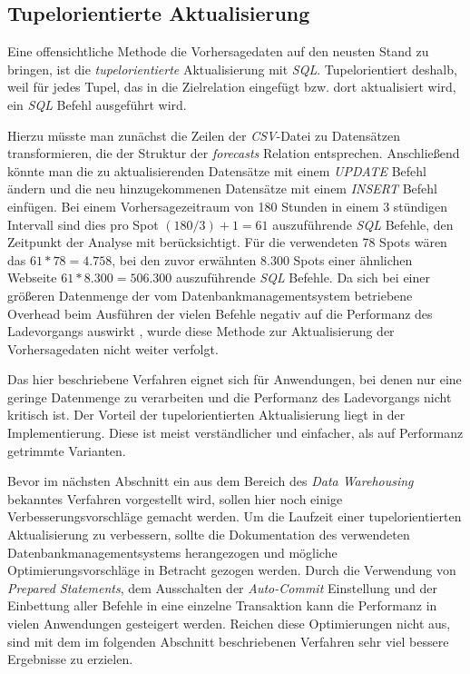 \subsection{Tupelorientierte Aktualisierung}
Eine offensichtliche Methode die Vorhersagedaten auf den neusten Stand
zu bringen, ist die \textit{tupelorientierte} Aktualisierung mit
\textit{SQL}. Tupelorientiert deshalb, weil für jedes Tupel, das in
die Zielrelation eingefügt bzw. dort aktualisiert wird, ein
\textit{SQL} Befehl ausgeführt wird.

Hierzu müsste man zunächst die Zeilen der \textit{CSV}-Datei zu
Datensätzen transformieren, die der Struktur der \textit{forecasts}
Relation entsprechen. Anschließend könnte man die zu aktualisierenden
Datensätze mit einem \textit{UPDATE} Befehl ändern und die neu
hinzugekommenen Datensätze mit einem \textit{INSERT} Befehl
einfügen. Bei einem Vorhersagezeitraum von 180 Stunden in einem 3
stündigen Intervall sind dies pro Spot $(180 / 3) + 1 = 61$
auszuführende \textit{SQL} Befehle, den Zeitpunkt der Analyse mit
berücksichtigt. Für die verwendeten 78 Spots wären das $61 * 78 =
4.758$, bei den zuvor erwähnten 8.300 Spots einer ähnlichen Webseite
$61 * 8.300 = 506.300$ auszuführende \textit{SQL} Befehle. Da sich bei
einer größeren Datenmenge der vom Datenbankmanagementsystem betriebene
Overhead beim Ausführen der vielen Befehle negativ auf die Performanz
des Ladevorgangs auswirkt \cite{postgresql:populate}, wurde diese
Methode zur Aktualisierung der Vorhersagedaten nicht weiter verfolgt.

Das hier beschriebene Verfahren eignet sich für Anwendungen, bei denen
nur eine geringe Datenmenge zu verarbeiten und die Performanz des
Ladevorgangs nicht kritisch ist. Der Vorteil der tupelorientierten
Aktualisierung liegt in der Implementierung. Diese ist meist
verständlicher und einfacher, als auf Performanz getrimmte Varianten.

Bevor im nächsten Abschnitt ein aus dem Bereich des \textit{Data
  Warehousing} bekanntes Verfahren vorgestellt wird, sollen hier noch
einige Verbesserungsvorschläge gemacht werden. Um die Laufzeit einer
tupelorientierten Aktualisierung zu verbessern, sollte die
Dokumentation des verwendeten Datenbankmanagementsystems
herangezogen und mögliche Optimierungsvorschläge in Betracht gezogen
werden. Durch die Verwendung von \textit{Prepared Statements}, dem
Ausschalten der \textit{Auto-Commit} Einstellung und der Einbettung
aller Befehle in eine einzelne Transaktion kann die Performanz in
vielen Anwendungen gesteigert werden. Reichen diese Optimierungen
nicht aus, sind mit dem im folgenden Abschnitt beschriebenen Verfahren
sehr viel bessere Ergebnisse zu erzielen.

